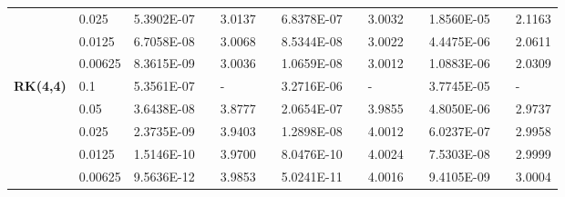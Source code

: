 \documentclass[preprint,compress,3p,10pt,fleqn]{elsarticle}
\numberwithin{equation}{section}
\begin{document}
\begin{table}[H]
\begin{tabular}{lllllrlrlrlrlrl}
\multicolumn{2}{l}{} & \multicolumn{2}{l}{0.025} & 5.3902E-07 &       & 3.0137  &       & 6.8378E-07 &       & 3.0032  &       & 1.8560E-05 &       & 2.1163  \\
\multicolumn{2}{l}{} & \multicolumn{2}{l}{0.0125} & 6.7058E-08 &       & 3.0068  &       & 8.5344E-08 &       & 3.0022  &       & 4.4475E-06 &       & 2.0611  \\
\multicolumn{2}{l}{} & \multicolumn{2}{l}{0.00625} & 8.3615E-09 &       & 3.0036  &       & 1.0659E-08 &       & 3.0012  &       & 1.0883E-06 &       & 2.0309  \\
\multicolumn{2}{l}{\multirow{5}[1]{*}{\textbf{RK(4,4)}}} & \multicolumn{2}{l}{0.1} & 5.3561E-07 &       & -     &       & 3.2716E-06 &       & -     &       & 3.7745E-05 &       & - \\
\multicolumn{2}{l}{} & \multicolumn{2}{l}{0.05} & 3.6438E-08 &       & 3.8777  &       & 2.0654E-07 &       & 3.9855  &       & 4.8050E-06 &       & 2.9737  \\
\multicolumn{2}{l}{} & \multicolumn{2}{l}{0.025} & 2.3735E-09 &       & 3.9403  &       & 1.2898E-08 &       & 4.0012  &       & 6.0237E-07 &       & 2.9958  \\
\multicolumn{2}{l}{} & \multicolumn{2}{l}{0.0125} & 1.5146E-10 &       & 3.9700  &       & 8.0476E-10 &       & 4.0024  &       & 7.5303E-08 &       & 2.9999  \\
\multicolumn{2}{l}{} & \multicolumn{2}{l}{0.00625} & 9.5636E-12 &       & 3.9853  &       & 5.0241E-11 &       & 4.0016  &       & 9.4105E-09 &       & 3.0004  \\
\bottomrule
\end{tabular}%
\label{tab:6-3}%
\end{table}%
\vspace{-10mm}
\end{document}
